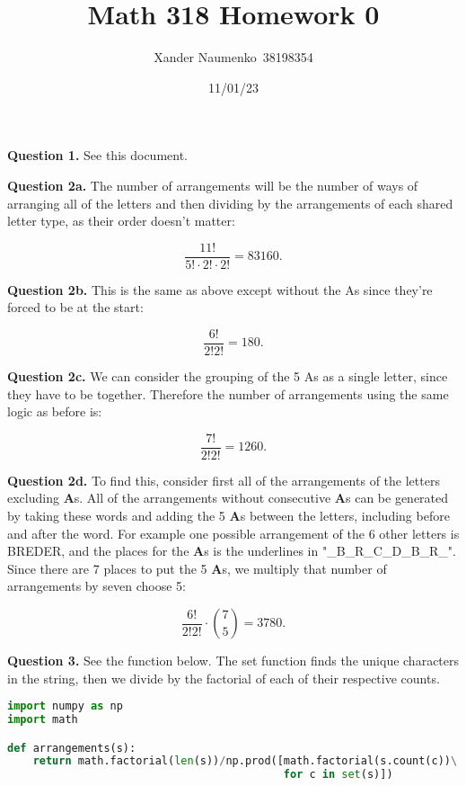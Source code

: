 \documentclass[letterpaper, reqno,11pt]{article}
\begin{document}
\title{Math 318 Homework 0}
\date{11/01/23}
\author{Xander Naumenko\ 38198354}
\maketitle

{\noindent\bf Question 1.} See this document.  

{\noindent\bf Question 2a.} The number of arrangements will be the number of ways of arranging all of the letters and then dividing by the arrangements of each shared letter type, as their order doesn't matter: 

\[
    \frac{11!}{5!\cdot 2!\cdot 2!} = 83160
.\]

{\noindent\bf Question 2b.} This is the same as above except without the As since they're forced to be at the start: 

\[
    \frac{6!}{2!2!}=180
.\]

{\noindent\bf Question 2c.} We can consider the grouping of the 5 As as a single letter, since they have to be together. Therefore the number of arrangements using the same logic as before is: 

\[
    \frac{7!}{2!2!}=1260
.\]

{\noindent\bf Question 2d.} To find this, consider first all of the arrangements of the letters excluding {\bf A}s. All of the arrangements without consecutive {\bf A}s can be generated by taking these words and adding the 5 {\bf A}s between the letters, including before and after the word. For example one possible arrangement of the 6 other letters is BREDER, and the places for the {\bf A}s is the underlines in "\_B\_R\_C\_D\_B\_R\_". Since there are 7 places to put the 5 {\bf A}s, we multiply that number of arrangements by seven choose 5: 

\[
    \frac{6!}{2!2!}\cdot {7\choose 5} = 3780
.\]

{\noindent\bf Question 3.} See the function below. The set function finds the unique characters in the string, then we divide by the factorial of each of their respective counts.  

\begin{lstlisting}[language=Python]
import numpy as np
import math

def arrangements(s):
    return math.factorial(len(s))/np.prod([math.factorial(s.count(c))\
                                           for c in set(s)])
\end{lstlisting}
\end{document}
